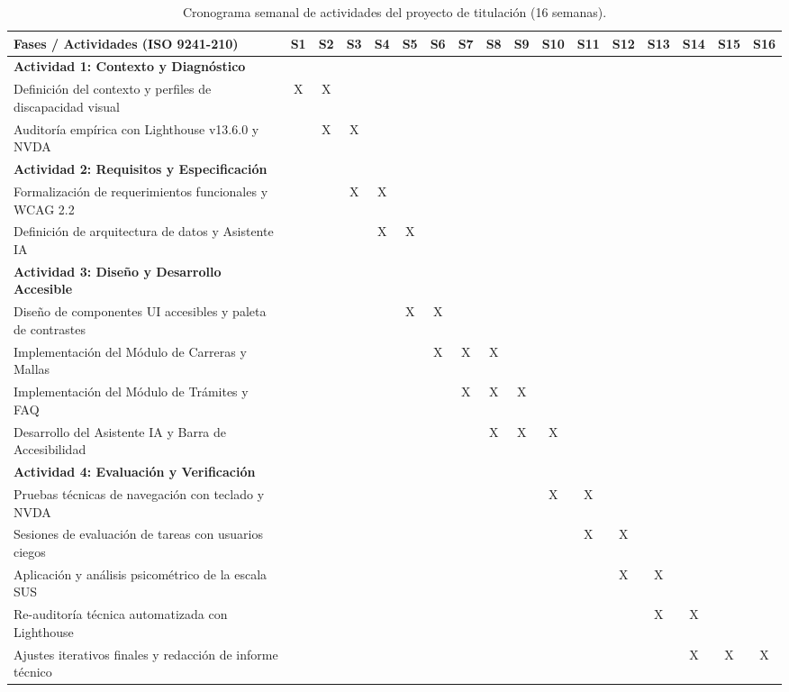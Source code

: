 \begin{table}[htbp]
  \centering
  \scriptsize
  \caption{Cronograma semanal de actividades del proyecto de titulación (16 semanas).}
  \label{tab:cronograma}
  \setlength{\tabcolsep}{2.5pt}
  \renewcommand{\arraystretch}{1.20}
  \begin{tabular}{|p{}|c|c|c|c|c|c|c|c|c|c|c|c|c|c|c|c|}
    \hline
    \textbf{Fases / Actividades (ISO 9241-210)} & \textbf{S1} & \textbf{S2} & \textbf{S3} & \textbf{S4} & \textbf{S5} & \textbf{S6} & \textbf{S7} & \textbf{S8} & \textbf{S9} & \textbf{S10} & \textbf{S11} & \textbf{S12} & \textbf{S13} & \textbf{S14} & \textbf{S15} & \textbf{S16} \\
    \hline
    \textbf{Actividad 1: Contexto y Diagnóstico} & & & & & & & & & & & & & & & & \\
    Definición del contexto y perfiles de discapacidad visual & X & X & & & & & & & & & & & & & & \\
    Auditoría empírica con Lighthouse v13.6.0 y NVDA & & X & X & & & & & & & & & & & & & \\
    \hline
    \textbf{Actividad 2: Requisitos y Especificación} & & & & & & & & & & & & & & & & \\
    Formalización de requerimientos funcionales y WCAG 2.2 & & & X & X & & & & & & & & & & & & \\
    Definición de arquitectura de datos y Asistente IA & & & & X & X & & & & & & & & & & & \\
    \hline
    \textbf{Actividad 3: Diseño y Desarrollo Accesible} & & & & & & & & & & & & & & & & \\
    Diseño de componentes UI accesibles y paleta de contrastes & & & & & X & X & & & & & & & & & & \\
    Implementación del Módulo de Carreras y Mallas & & & & & & X & X & X & & & & & & & & \\
    Implementación del Módulo de Trámites y FAQ & & & & & & & X & X & X & & & & & & & \\
    Desarrollo del Asistente IA y Barra de Accesibilidad & & & & & & & & X & X & X & & & & & & \\
    \hline
    \textbf{Actividad 4: Evaluación y Verificación} & & & & & & & & & & & & & & & & \\
    Pruebas técnicas de navegación con teclado y NVDA & & & & & & & & & & X & X & & & & & \\
    Sesiones de evaluación de tareas con usuarios ciegos & & & & & & & & & & & X & X & & & & \\
    Aplicación y análisis psicométrico de la escala SUS & & & & & & & & & & & & X & X & & & \\
    Re-auditoría técnica automatizada con Lighthouse & & & & & & & & & & & & & X & X & & \\
    Ajustes iterativos finales y redacción de informe técnico & & & & & & & & & & & & & & X & X & X \\
    \hline
  \end{tabular}
\end{table}
